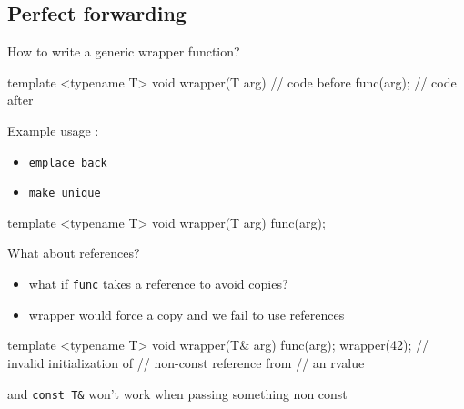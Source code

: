 \subsection[forward]{Perfect forwarding}

\begin{frame}[fragile]
  How to write a generic wrapper function?
  \begin{block}{}
    \begin{cppcode*}{}
      template <typename T>
      void wrapper(T arg) {
        // code before
        func(arg);
        // code after
      }
    \end{cppcode*}
  \end{block}
  Example usage :
  \begin{itemize}
  \item \texttt{emplace_back}
  \item \texttt{make_unique}
  \end{itemize}
\end{frame}

\begin{frame}[fragile]
  \begin{block}{}
    \begin{cppcode*}{}
      template <typename T>
      void wrapper(T arg) {
        func(arg);
      }
    \end{cppcode*}
  \end{block}
  \begin{alertblock}{What about references?}
    \begin{itemize}
      \item what if \texttt{func} takes a reference to avoid copies?
      \item wrapper would force a copy and we fail to use references
    \end{itemize}

  \end{alertblock}
\end{frame}

\begin{frame}[fragile]
  \begin{block}{}
    \begin{cppcode*}{}
      template <typename T>
      void wrapper(T& arg) {
        func(arg);
      }
      wrapper(42);
      // invalid initialization of
      // non-const reference from
      // an rvalue
    \end{cppcode*}
  \end{block}
  \begin{alertblock}{}
     and \texttt{const T&} won't work when passing something non const
  \end{alertblock}
\end{frame}

